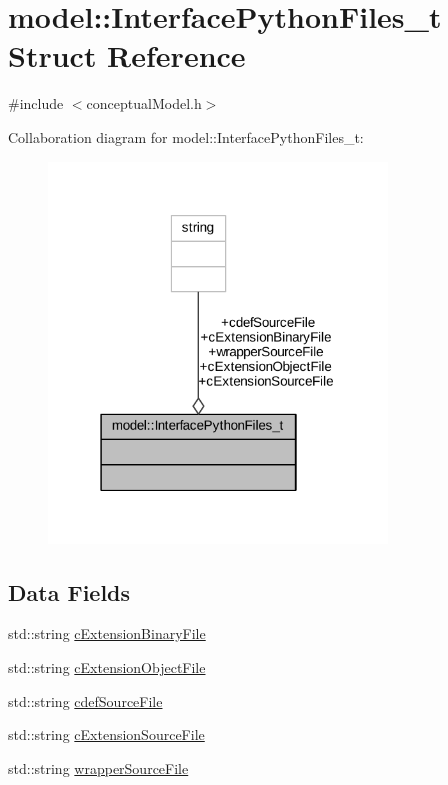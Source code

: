 \hypertarget{structmodel_1_1_interface_python_files__t}{}\section{model\+:\+:Interface\+Python\+Files\+\_\+t Struct Reference}
\label{structmodel_1_1_interface_python_files__t}


{\ttfamily \#include $<$conceptual\+Model.\+h$>$}



Collaboration diagram for model\+:\+:Interface\+Python\+Files\+\_\+t\+:
\nopagebreak
\begin{figure}[H]
\begin{center}
\leavevmode
\includegraphics[width=255pt]{structmodel_1_1_interface_python_files__t__coll__graph}
\end{center}
\end{figure}
\subsection*{Data Fields}
\begin{DoxyCompactItemize}
\item 
std\+::string \hyperlink{structmodel_1_1_interface_python_files__t_a830a48b4357d9ecb108e17b47e31855b}{c\+Extension\+Binary\+File}
\item 
std\+::string \hyperlink{structmodel_1_1_interface_python_files__t_a8f4c3b6583e8bae85c6afe7c7ee6cfc6}{c\+Extension\+Object\+File}
\item 
std\+::string \hyperlink{structmodel_1_1_interface_python_files__t_ac420790c5ffb7a46a1188cb8d17a9c3e}{cdef\+Source\+File}
\item 
std\+::string \hyperlink{structmodel_1_1_interface_python_files__t_a00a2f580c3ce5af095671068af355dee}{c\+Extension\+Source\+File}
\item 
std\+::string \hyperlink{structmodel_1_1_interface_python_files__t_a5a4bb81312881768c054b4305b4f9f3d}{wrapper\+Source\+File}
\end{DoxyCompactItemize}


